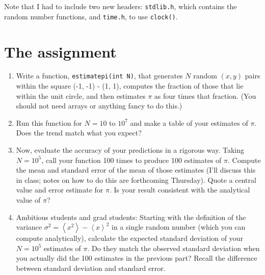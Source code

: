 \documentclass[12pt]{article}
\def\LL{\left\langle}   %
\def\RR{\right\rangle}  %
\begin{document}
Note that I had to include two new headers: {\tt stdlib.h}, which contains the random number functions, and {\tt time.h}, to use {\tt clock()}.

\section{The assignment}

\begin{enumerate}

\item Write a function, {\tt estimatepi(int N)}, that generates $N$ random $(x,y)$ pairs within the square (-1, -1) - (1, 1), computes the fraction of those that lie within the unit circle, and then estimates $\pi$ as four
times that fraction. (You should not need arrays or anything fancy to do this.)

\item Run this function for $N=10$ to $10^7$ and make a table of your estimates of $\pi$. Does the trend match what you expect?

\item Now, evaluate the accuracy of your predictions in a rigorous way. Taking $N=10^5$, call your function 100 times to produce 100 estimates of $\pi$. Compute the mean and standard error of the mean of those estimates (I'll discuss this 
in class; notes on how to do this are forthcoming Thursday). Quote a central value and error estimate for $\pi$. Is your result consistent with the analytical value of $\pi$?

\item Ambitious students and grad students: Starting with the definition of the variance $\sigma^2 = \LL x^2 \RR - \LL x \RR^2$ in a single random number (which you can compute analytically), calculate the expected standard 
deviation of your $N=10^5$ estimates of $\pi$. Do they match the observed standard deviation when you actually did the 100 estimates in the previous part? Recall the difference between standard deviation and standard error.
\end{enumerate}
\end{document}
